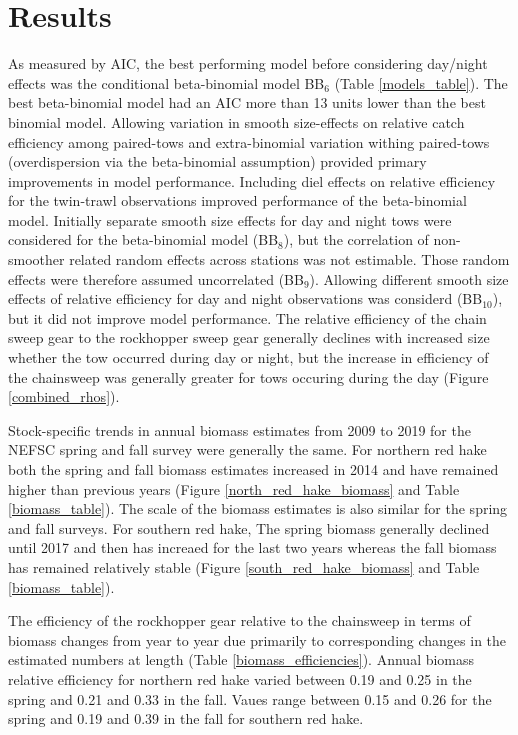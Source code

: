 \documentclass[12pt,letterpaper, leqno]{article}
\begin{document}
\section*{Results}

As measured by AIC, the best performing model before considering day/night effects was the conditional beta-binomial model BB$_6$ (Table \ref{models_table}). The best beta-binomial model had an AIC more than 13 units lower than the best binomial model. Allowing variation in smooth size-effects on relative catch efficiency among paired-tows and extra-binomial variation withing paired-tows  (overdispersion via the beta-binomial assumption) provided primary improvements in model performance. Including diel effects on relative efficiency for the twin-trawl observations improved performance of the beta-binomial model. Initially separate smooth size effects for day and night tows were considered for the beta-binomial model (BB$_8$), but the correlation of non-smoother related random effects across stations was not estimable. Those random effects were therefore assumed uncorrelated (BB$_9$). Allowing different smooth size effects of relative efficiency for day and night observations was considerd (BB$_{10}$), but it did not improve model performance. The relative efficiency of the chain sweep gear to the rockhopper sweep gear generally declines with increased size whether the tow occurred during day or night, but the increase in efficiency of the chainsweep was generally greater for tows occuring during the day (Figure \ref{combined_rhos}). 

Stock-specific trends in annual biomass estimates from 2009 to 2019 for the NEFSC spring and fall survey were generally the same. For northern red hake both the spring and fall biomass estimates increased in 2014 and have remained higher than previous years (Figure \ref{north_red_hake_biomass} and Table \ref{biomass_table}). The scale of the biomass estimates is also similar for the spring and fall surveys. For southern red hake, The spring biomass generally declined until 2017 and then has increaed for the last two years whereas the fall biomass has remained relatively stable (Figure \ref{south_red_hake_biomass} and Table \ref{biomass_table}). 

The efficiency of the rockhopper gear relative to the chainsweep in terms of biomass changes from year to year due primarily to corresponding changes in the estimated numbers at length (Table \ref{biomass_efficiencies}). Annual biomass relative efficiency for northern red hake varied between 0.19 and 0.25 in the spring and 0.21 and 0.33 in the fall. Vaues range between 0.15 and 0.26 for the spring and 0.19 and 0.39 in the fall for southern red hake. 
\end{document}
